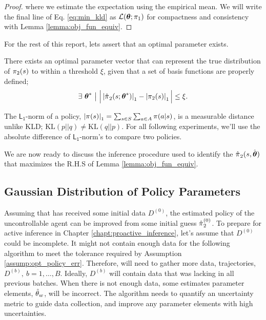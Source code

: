 \begin{proof}
        \noindent
        where we estimate the expectation using the empirical mean. We will write the final line of Eq.
        \ref{eq:min_kld} as $\mathcal{L}(\boldsymbol{\mathbb{\theta}}; \pi_{1})$ for compactness and consistency with Lemma
        \ref{lemma:obj_fun_equiv}.

    \end{proof}

    For the rest of this report, lets assert that an optimal parameter exists.
    \begin{assumption}\label{assump:opt_policy_err}
        There exists an optimal parameter vector that can represent the true distribution of $\pi_{2}(s)$ to within a
        threshold $\xi$, given that a set of basis functions are properly defined;
        \[
        \exists\ \boldsymbol{\mathbb{\theta}}^*\ \big|\ \Big| \left|\hat{\pi_{}}_2(s;\boldsymbol{\mathbb{\theta}}^*)\right|_1 -
            \left|\pi_{2}(s)\right|_1 \Big| \leq \xi.
        \]
    \end{assumption}

    \noindent
    The $\mathsf{L_1}$-norm of a policy, $\left|\pi_{}(s)\right|_1 = \sum_{s \in S}\sum_{a \in A}\pi_{}(a|s)$, is a
    measurable distance unlike \ac{KLD}; $\text{KL}(p||q) \neq \text{KL}(q||p)$. For all following experiments, we'll
    use the absolute difference of $\mathsf{L_1}$-norm's to compare two policies.

    We are now ready to discuss the inference procedure used to identify the $\hat{\pi_{}}_2(s,
    \hat{\boldsymbol{\mathbb{\theta}}})$ that maximizes the R.H.S of Lemma \ref{lemma:obj_fun_equiv}.

\subsection{Gaussian Distribution of Policy Parameters}\label{sec:gauss_policy}


    Assuming that  has received some initial data $D^{(0)}$, the estimated policy of the uncontrollable agent
    can be improved from some initial guess $\hat{\pi_{}}_2^{(0)}$. To prepare for active inference in Chapter
    \ref{chapt:proactive_inference}, let's assume that $D^{(0)}$ could be incomplete. It might not contain enough data
    for the following algorithm to meet the tolerance required by Assumption \ref{assump:opt_policy_err}. Therefore,
     will need to gather more data, trajectories, $D^{(b)},\ b=1,\ldots,B$. Ideally, $D^{(b)}$ will contain
    data that was lacking in all previous batches. When there is not enough data, some estimates parameter elements,
    $\hat{\theta}_{w}$, will be incorrect. The algorithm needs to quantify an uncertainty metric to guide
    data collection, and improve any parameter elements with high uncertainties.

